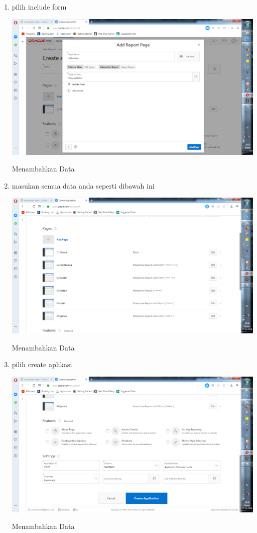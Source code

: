 \documentclass{article}
\begin{document}
\begin{enumerate}
    \item pilih include form
    \begin{center}
         \centering
            \includegraphics[scale=0.27]{gambar/21.png}
        \caption{Menambahkan Data}
        \label{excel}
    \end{center}
    
        \item masukan semua data anda seperti dibawah ini
    \begin{center}
         \centering
            \includegraphics[scale=0.27]{gambar/22.png}
        \caption{Menambahkan Data}
        \label{excel}
    \end{center}
    
        \item pilih create aplikasi
    \begin{center}
         \centering
            \includegraphics[scale=0.27]{gambar/23.png}
        \caption{Menambahkan Data}
        \label{excel}
    \end{center}
    

\end{enumerate}
\end{document}
